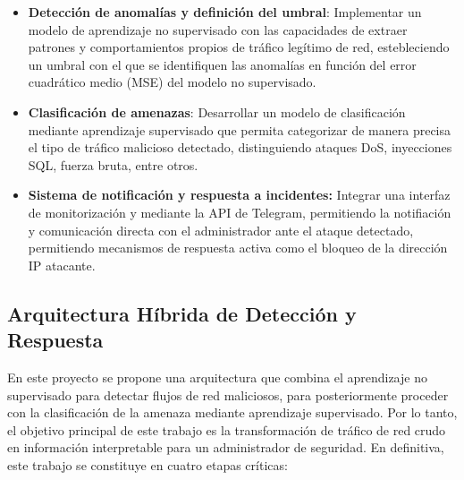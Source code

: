 \documentclass[12pt]{article}
\numberwithin{equation}{section} %
\begin{document}
    \begin{itemize}
        \item \textbf{Detección de anomalías y definición del umbral}: Implementar un modelo de aprendizaje no supervisado con las capacidades de extraer patrones y comportamientos propios de tráfico legítimo de red, estebleciendo un umbral con el que se identifiquen las anomalías en función del error cuadrático medio (MSE) del modelo no supervisado.
        
        \vspace{5mm}

        \item \textbf{Clasificación de amenazas}: Desarrollar un modelo de clasificación mediante aprendizaje supervisado que permita categorizar de manera precisa el tipo de tráfico malicioso detectado, distinguiendo ataques DoS, inyecciones SQL, fuerza bruta, entre otros.
                
        \vspace{5mm}

        \item \textbf{Sistema de notificación y respuesta a incidentes:} Integrar una interfaz de monitorización y mediante la API de Telegram, permitiendo la notifiación y comunicación directa con el administrador ante el ataque detectado, permitiendo mecanismos de respuesta activa como el bloqueo de la dirección IP atacante.
    \end{itemize}

    \vspace{10mm}





    \subsection{Arquitectura Híbrida de Detección y Respuesta}

    \vspace{5mm}

    En este proyecto se propone una arquitectura que combina el aprendizaje no supervisado para detectar flujos de red maliciosos, para posteriormente proceder con la clasificación de la amenaza mediante aprendizaje supervisado. Por lo tanto, el objetivo principal de este trabajo es la transformación de tráfico de red crudo en información interpretable para un administrador de seguridad. En definitiva, este trabajo se constituye en cuatro etapas críticas:

    \vspace{5mm}
\end{document}
